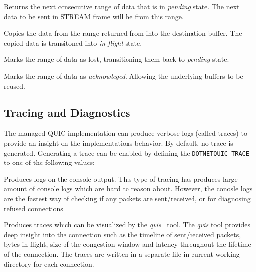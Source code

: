 \begin{description}

        Returns the next consecutive range of data that is in \textit{pending} state. The next data
to be sent in STREAM{} frame will be from this range.

        Copies the data from the range returned from  into the
destination buffer. The copied data is transitoned into \textit{in-flight} state.

        Marks the range of data as lost, transitioning them back to \textit{pending} state.

        Marks the range of data as \textit{acknowleged}. Allowing the underlying buffers to be reused.

\end{description}

\subsection{Tracing and Diagnostics}


The managed QUIC implementation can produce verbose logs (called traces) to provide an insight on
the implementations behavior. By default, no trace is generated. Generating a trace can be enabled
by defining the \texttt{DOTNETQUIC_TRACE} to one of the following values:

\begin{description}

     Produces logs on the console output. This type of tracing has produces
large amount of console logs which are hard to reason about. However, the conosle logs are the
fastest way of checking if any packets are sent/received, or for diagnosing refused connections.

 Produces traces which can be visualized by the
\textit{qvis}~\cite{web:qvis} tool. The \textit{qvis} tool provides deep insight into the connection
such as the timeline of sent/received packets, bytes in flight, size of the congestion window and
latency throughout the lifetime of the connection. The traces are written in a separate file in current
working directory for each connection.

\end{description}


